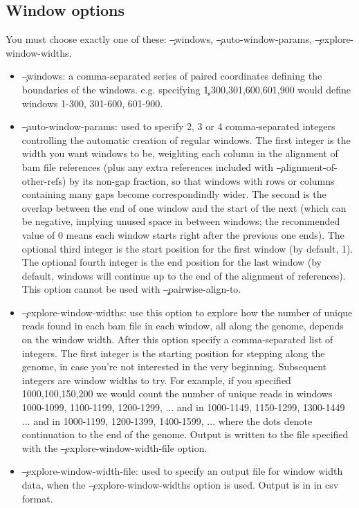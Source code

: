 \subsection{Window options}
You must choose exactly one of these: \c{--windows}, \c{--auto-window-params}, \c{--explore-window-widths}.
\begin{itemize}
\item \c{--windows}: a comma-separated series of paired coordinates defining the boundaries of the windows.
e.g. specifying \c{1,300,301,600,601,900} would define windows 1-300, 301-600, 601-900.
\item \c{--auto-window-params}: used to specify 2, 3 or 4 comma-separated integers controlling the automatic creation of regular windows.
The first integer is the width you want windows to be, weighting each column in the alignment of bam file references (plus any extra references included with \c{--alignment-of-other-refs}) by its non-gap fraction, so that windows with rows or columns containing many gaps become correspondindly wider.
The second is the overlap between the end of one window and the start of the next (which can be negative, implying unused space in between windows; the recommended value of 0 means each window starts right after the previous one ends).
The optional third integer is the start position for the first window (by default, 1).
The optional fourth integer is the end position for the last window (by default, windows will continue up to the end of the alignment of references).
This option cannot be used with \c{--pairwise-align-to}.
\item \c{--explore-window-widths}: use this option to explore how the number of unique reads found in each bam file in each window, all along the genome, depends on the window width.
After this option specify a comma-separated list of integers.
The first integer is the starting position for stepping along the genome, in case you're not interested in the very beginning.
Subsequent integers are window widths to try.
For example, if you specified 1000,100,150,200 we would count the number of unique reads in windows 1000-1099, 1100-1199, 1200-1299, ... and in 1000-1149, 1150-1299, 1300-1449 ... and in 1000-1199, 1200-1399, 1400-1599, ... where the dots denote continuation to the end of the genome.
Output is written to the file specified with the \c{--explore-window-width-file} option.
\item \c{--explore-window-width-file}: used to specify an output file for window width data, when the \c{--explore-window-widths} option is used.
Output is in in csv format.
\end{itemize}

